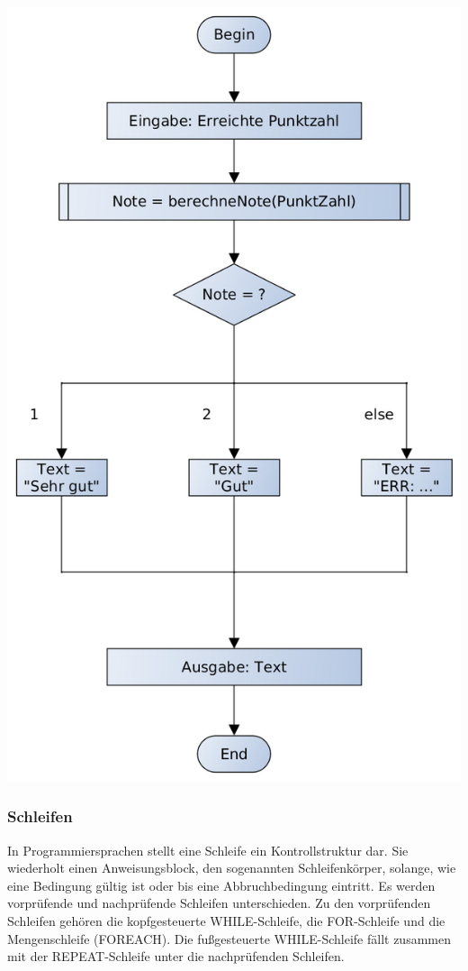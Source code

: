 \includegraphics[scale=0.5]{1jahr_pictures/lf06prog-pic/lf06prog-switch-case-pap.png}

\subsubsection{Schleifen}

In Programmiersprachen stellt eine Schleife ein Kontrollstruktur dar. Sie wiederholt einen Anweisungsblock, den sogenannten Schleifenkörper, solange, wie eine Bedingung gültig ist oder bis eine Abbruchbedingung eintritt. Es werden vorprüfende und nachprüfende Schleifen unterschieden. Zu den vorprüfenden Schleifen gehören die kopfgesteuerte WHILE-Schleife, die FOR-Schleife und die Mengenschleife (FOREACH). Die fußgesteuerte WHILE-Schleife fällt zusammen mit der REPEAT-Schleife unter die nachprüfenden Schleifen.

